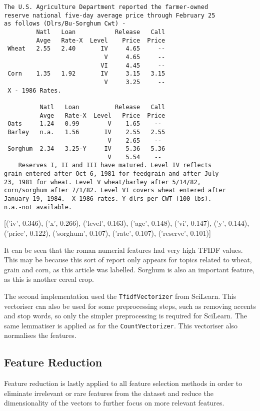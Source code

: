 \documentclass{article}
\begin{document}
\begin{verbatim}
The U.S. Agriculture Department reported the farmer-owned
reserve national five-day average price through February 25
as follows (Dlrs/Bu-Sorghum Cwt) -
         Natl   Loan           Release   Call
         Avge   Rate-X  Level    Price  Price
 Wheat   2.55   2.40       IV     4.65     --
                            V     4.65     --
                           VI     4.45     --
 Corn    1.35   1.92       IV     3.15   3.15
                            V     3.25     --
 X - 1986 Rates.

          Natl   Loan          Release   Call
          Avge   Rate-X  Level   Price  Price
 Oats     1.24   0.99        V    1.65    -- 
 Barley   n.a.   1.56       IV    2.55   2.55
                             V    2.65    -- 
 Sorghum  2.34   3.25-Y     IV    5.36   5.36
                             V    5.54    -- 
    Reserves I, II and III have matured. Level IV reflects
grain entered after Oct 6, 1981 for feedgrain and after July
23, 1981 for wheat. Level V wheat/barley after 5/14/82,
corn/sorghum after 7/1/82. Level VI covers wheat entered after
January 19, 1984.  X-1986 rates. Y-dlrs per CWT (100 lbs).
n.a.-not available.
\end{verbatim}

[('iv', 0.346), ('x', 0.266), ('level', 0.163), ('age', 0.148), ('vi', 0.147), ('y', 0.144), ('price', 0.122), ('sorghum', 0.107), ('rate', 0.107), ('reserve', 0.101)]

It can be seen that the roman numerial features had very high TFIDF values. This may be because this sort of report only appears for topics related to wheat, grain and corn, as this article was labelled. Sorghum is also an important feature, as this is another cereal crop.

The second implementation used the \verb|TfidfVectorizer| from SciLearn. This vectoriser can also be used for some preprocessing steps, such as removing accents and stop words, so only the simpler preprocessing is required for SciLearn. The same lemmatiser is applied as for the \verb|CountVectorizer|. This vectoriser also normalises the features.

\subsection{Feature Reduction}
Feature reduction is lastly applied to all feature selection methods in order to eliminate irrelevant or rare features from the dataset and reduce the dimensionality of the vectors to further focus on more relevant features.
\end{document}
